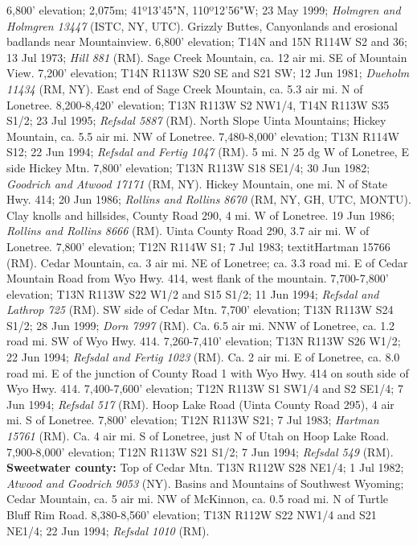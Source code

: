 6,800' elevation; 2,075m; 41º13'45"N, 110º12'56"W; 23 May 1999;
\textit{Holmgren and Holmgren 13447} (ISTC, NY, UTC).
Grizzly Buttes, Canyonlands and erosional badlands near Mountainview.
6,800' elevation;	T14N and 15N R114W S2 and 36; 13 Jul 1973;
\textit{Hill 881} (RM).
Sage Creek Mountain, ca. 12 air mi. SE of Mountain View. 7,200' elevation;
T14N R113W S20 SE and S21 SW; 12 Jun 1981; \textit{Dueholm 11434} (RM, NY).
East end of Sage Creek Mountain, ca. 5.3 air mi. N of Lonetree.
8,200-8,420' elevation; T13N R113W S2 NW1/4, T14N R113W S35 S1/2; 23 Jul 1995;
\textit{Refsdal 5887} (RM).
North Slope Uinta Mountains; Hickey Mountain, ca. 5.5 air mi. NW of Lonetree.
7,480-8,000' elevation; T13N R114W S12; 22 Jun 1994;
\textit{Refsdal and Fertig 1047} (RM).
5 mi. N 25 dg W of Lonetree, E side Hickey Mtn. 7,800' elevation;
T13N R113W S18 SE1/4; 30 Jun 1982; \textit{Goodrich and Atwood 17171} (RM, NY).
Hickey Mountain, one mi. N of State Hwy. 414; 20 Jun 1986;
\textit{Rollins and Rollins 8670} (RM, NY, GH, UTC, MONTU).
Clay knolls and hillsides, County Road 290, 4 mi. W of Lonetree. 19 Jun 1986;
\textit{Rollins and Rollins 8666} (RM).
Uinta County Road 290, 3.7 air mi. W of Lonetree. 7,800' elevation;
T12N R114W S1; 7 Jul 1983; textit{Hartman 15766} (RM).
Cedar Mountain, ca. 3 air mi. NE of Lonetree; ca. 3.3 road mi. E of Cedar
Mountain Road from Wyo Hwy. 414, west flank of the mountain.
7,700-7,800' elevation; T13N R113W S22 W1/2 and S15 S1/2; 11 Jun 1994;
\textit{Refsdal and Lathrop 725} (RM).
SW side of Cedar Mtn. 7,700' elevation; T13N R113W S24 S1/2; 28 Jun 1999;
\textit{Dorn 7997} (RM).
Ca. 6.5 air mi. NNW of Lonetree, ca. 1.2 road mi. SW of Wyo Hwy. 414.
7,260-7,410' elevation; T13N R113W S26 W1/2; 22 Jun 1994;
\textit{Refsdal and Fertig 1023} (RM).
Ca. 2 air mi. E of Lonetree, ca. 8.0 road mi. E of the junction of County Road 1
with Wyo Hwy. 414 on south side of Wyo Hwy. 414. 7,400-7,600' elevation;
T12N R113W S1 SW1/4 and S2 SE1/4; 7 Jun 1994; \textit{Refsdal 517} (RM).
Hoop Lake Road (Uinta County Road 295), 4 air mi. S of Lonetree.
7,800' elevation; T12N R113W S21; 7 Jul 1983; \textit{Hartman 15761} (RM).
Ca. 4 air mi. S of Lonetree, just N of Utah on Hoop Lake Road.
7,900-8,000' elevation; T12N R113W S21 S1/2; 7 Jun 1994;
\textit{Refsdal 549} (RM).
  \textbf{Sweetwater county:}
Top of Cedar Mtn. T13N R112W S28 NE1/4; 1 Jul 1982;
\textit{Atwood and Goodrich 9053} (NY).
Basins and Mountains of Southwest Wyoming; Cedar Mountain, ca. 5 air mi. NW of
McKinnon, ca. 0.5 road mi. N of Turtle Bluff Rim Road. 8,380-8,560' elevation;
T13N R112W S22 NW1/4 and S21 NE1/4; 22 Jun 1994; \textit{Refsdal 1010} (RM).
